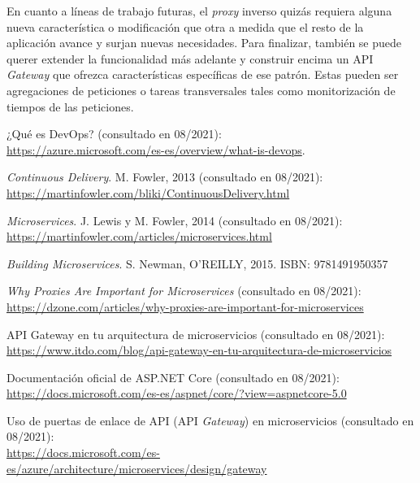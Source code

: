 \documentclass[11pt,spanish,listoffigures]{tfgetsinf}
\begin{document}
En cuanto a líneas de trabajo futuras, el \emph{proxy} inverso quizás requiera alguna nueva característica o modificación que otra a medida que el resto de la aplicación avance y surjan nuevas necesidades. Para finalizar, también se puede querer extender la funcionalidad más adelante y construir encima un API \emph{Gateway} que ofrezca características específicas de ese patrón. Estas pueden ser agregaciones de peticiones o tareas transversales tales como monitorización de tiempos de las peticiones.


\renewcommand{\bibname}{Referencias}

\begin{thebibliography}{10}

¿Qué es DevOps? (consultado en 08/2021):\\
\url{https://azure.microsoft.com/es-es/overview/what-is-devops}.

\emph{Continuous Delivery}.
\newblock M. Fowler, 2013 (consultado en 08/2021):\\
\url{https://martinfowler.com/bliki/ContinuousDelivery.html}

\newblock \emph{Microservices}.
\newblock J. Lewis y M. Fowler, 2014 (consultado en 08/2021):\\
\url{https://martinfowler.com/articles/microservices.html}

\newblock \emph{Building Microservices}.
\newblock S. Newman, O'REILLY, 2015.
\newblock ISBN: 9781491950357

\emph{Why Proxies Are Important for Microservices} (consultado en 08/2021):\\
\url{https://dzone.com/articles/why-proxies-are-important-for-microservices}

API Gateway en tu arquitectura de microservicios (consultado en 08/2021):\\
\url{https://www.itdo.com/blog/api-gateway-en-tu-arquitectura-de-microservicios}

Documentación oficial de ASP.NET Core (consultado en 08/2021):\\
\url{https://docs.microsoft.com/es-es/aspnet/core/?view=aspnetcore-5.0}

Uso de puertas de enlace de API (API \emph{Gateway}) en microservicios (consultado en 08/2021):\\
\url{https://docs.microsoft.com/es-es/azure/architecture/microservices/design/gateway}


\end{thebibliography}
\end{document}
